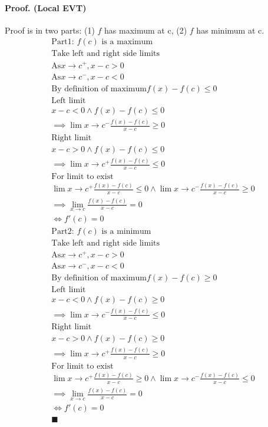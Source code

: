 \documentclass{article}
\begin{document}
	\paragraph{Proof. (Local EVT)} Proof is in two parts: (1) $f$ has maximum at c, (2) $f$ has minimum at c.
	\begin{align*}
		\text{Part1: $f(c)$ is a maximum} \\
		\text{Take left and right side limits} \\
		\text{As} x \to c^+, x - c > 0 \\
		\text{As} x \to c^-, x - c < 0 \\
		\text{By definition of maximum} f(x) - f(c) \leq 0 \\
		\text{Left limit } \\
		x - c < 0 \land f(x) - f(c) \leq 0 \\
		\implies \lim{x \to c^-} \frac{f(x) - f(c)}{x - c} \geq 0 \\
		\text{Right limit } \\
		x - c > 0 \land f(x) - f(c) \leq 0 \\
		\implies \lim{x \to c^+} \frac{f(x) - f(c)}{x - c} \leq 0 \\ 
		\text{For limit to exist} \\
		\lim{x \to c^+} \frac{f(x) - f(c)}{x - c} \leq 0 \land \lim{x \to c^-} \frac{f(x) - f(c)}{x - c} \geq 0 \\
		\implies \lim_{x \to c} \frac{f(x) - f(c)}{x - c} = 0 \\
		\iff f'(c) = 0 \\
		\text{Part2: $f(c)$ is a minimum} \\
		\text{Take left and right side limits} \\
		\text{As} x \to c^+, x - c > 0 \\
		\text{As} x \to c^-, x - c < 0 \\
		\text{By definition of maximum} f(x) - f(c) \geq 0 \\
		\text{Left limit } \\
		x - c < 0 \land f(x) - f(c) \geq 0 \\
		\implies \lim{x \to c^-} \frac{f(x) - f(c)}{x - c} \leq 0 \\
		\text{Right limit } \\
		x - c > 0 \land f(x) - f(c) \geq 0 \\
		\implies \lim{x \to c^+} \frac{f(x) - f(c)}{x - c} \geq 0 \\ 
		\text{For limit to exist} \\
		\lim{x \to c^+} \frac{f(x) - f(c)}{x - c} \geq 0 \land \lim{x \to c^-} \frac{f(x) - f(c)}{x - c} \leq 0 \\
		\implies \lim_{x \to c} \frac{f(x) - f(c)}{x - c} = 0 \\
		\iff f'(c) = 0 \\
		\blacksquare
	\end{align*}
\end{document}
